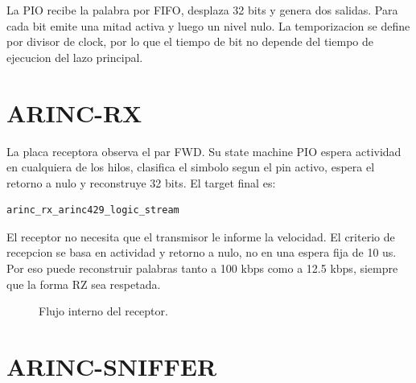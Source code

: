 \documentclass[12pt,a4paper,oneside]{report}
\begin{document}
La PIO recibe la palabra por FIFO, desplaza 32 bits y genera dos salidas. Para
cada bit emite una mitad activa y luego un nivel nulo. La temporizacion se
define por divisor de clock, por lo que el tiempo de bit no depende del tiempo
de ejecucion del lazo principal.

\section{ARINC-RX}

La placa receptora observa el par FWD. Su state machine PIO espera actividad en
cualquiera de los hilos, clasifica el simbolo segun el pin activo, espera el
retorno a nulo y reconstruye 32 bits. El target final es:

\begin{lstlisting}
arinc_rx_arinc429_logic_stream
\end{lstlisting}

El receptor no necesita que el transmisor le informe la velocidad. El criterio
de recepcion se basa en actividad y retorno a nulo, no en una espera fija de
10 us. Por eso puede reconstruir palabras tanto a 100 kbps como a 12.5 kbps,
siempre que la forma RZ sea respetada.

\begin{figure}[H]
\centering
{}
\caption{Flujo interno del receptor.}
\end{figure}

\section{ARINC-SNIFFER}
\end{document}
